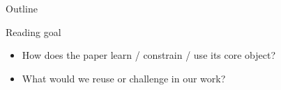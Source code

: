 \begin{frame}
  \titlepage
\end{frame}

\begin{frame}{Outline}
  \tableofcontents
\end{frame}

\begin{frame}{Reading goal}
  \begin{itemize}
    \item How does the paper learn / constrain / use its core object?
    \item What would we reuse or challenge in our work?
  \end{itemize}
\end{frame}
